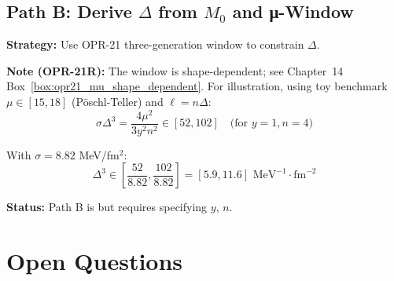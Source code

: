 \subsection{Path B: Derive $\Delta$ from $M_0$ and μ-Window}
\label{subsec:ch16_pathB}

\begin{tcolorbox}[colback=purple!5!white, colframe=purple!50!black,
    title=\textbf{Closure Path B (Phenomenological anchor)}]
\textbf{Strategy:} Use OPR-21 three-generation window to constrain $\Delta$.

\textbf{Note (OPR-21R):} The window is shape-dependent; see Chapter~14 Box~\ref{box:opr21_mu_shape_dependent}.
For illustration, using toy benchmark $\mu \in [15, 18]$ (P\"oschl-Teller) and $\ell = n\Delta$:
\begin{equation}
    \sigma \Delta^3 = \frac{4 \mu^2}{3 y^2 n^2} \in [52, 102]
    \quad \text{(for } y = 1, n = 4\text{)}
\end{equation}

With $\sigma = 8.82$ MeV/fm$^2$:
\begin{equation}
    \Delta^3 \in \left[\frac{52}{8.82}, \frac{102}{8.82}\right]
    = [5.9, 11.6] \text{ MeV}^{-1} \cdot \text{fm}^{-2}
\end{equation}

\textbf{Status:} Path B is \tagDc{} but requires specifying $y$, $n$.
\end{tcolorbox}

\section{Open Questions}
\label{sec:ch16_open}

